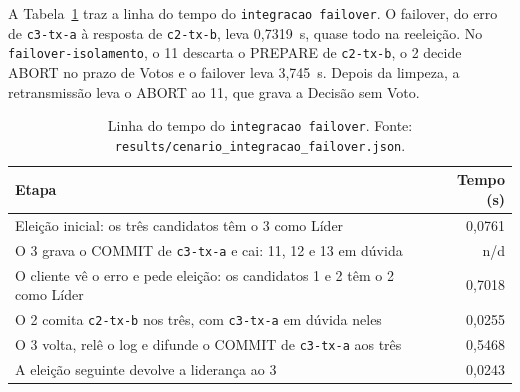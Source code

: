 \documentclass[conference]{IEEEtran}
\newcommand{\cod}[1]{\texttt{\upshape #1}}
\begin{document}
A Tabela~\ref{tab:failover} traz a linha do tempo do \cod{integracao failover}. O failover, do erro
de \cod{c3-tx-a} à resposta de \cod{c2-tx-b}, leva 0,7319~s, quase todo na reeleição. No
\cod{failover-isolamento}, o 11 descarta o PREPARE de \cod{c2-tx-b}, o 2 decide ABORT no prazo de
Votos e o failover leva 3,745~s. Depois da limpeza, a retransmissão leva o ABORT ao 11, que grava a
Decisão sem Voto.

\begin{table}[t]
\caption{Linha do tempo do \cod{integracao failover}. Fonte:
\cod{results/cenario\_integracao\_failover.json}.}
\label{tab:failover}
\centering
\footnotesize
\setlength{\tabcolsep}{4pt}
\begin{tabular}{@{}>{\raggedright\arraybackslash}p{6.6cm}r@{}}
\toprule
Etapa & Tempo (s) \\
\midrule
Eleição inicial: os três candidatos têm o 3 como Líder & 0,0761 \\
O 3 grava o COMMIT de \cod{c3-tx-a} e cai: 11, 12 e 13 em dúvida & n/d \\
O cliente vê o erro e pede eleição: os candidatos 1 e 2 têm o 2 como Líder & 0,7018 \\
O 2 comita \cod{c2-tx-b} nos três, com \cod{c3-tx-a} em dúvida neles & 0,0255 \\
O 3 volta, relê o log e difunde o COMMIT de \cod{c3-tx-a} aos três & 0,5468 \\
A eleição seguinte devolve a liderança ao 3 & 0,0243 \\
\bottomrule
\end{tabular}
\end{table}
\end{document}
